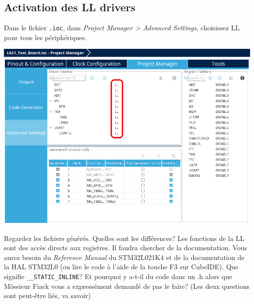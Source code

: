 \documentclass[12pt,%
addpoints,%
]{exam}
\begin{document}
\subsection{Activation des LL drivers}
\begin{questions}
	\question Dans le fichier \texttt{.ioc}, dans \emph{Project Manager > Advanced Settings}, choisissez LL pour tous les périphériques.
	\begin{center}
		\includegraphics[width=.9\linewidth]{figures/cube02.png} 
	\end{center}
	\question Regardez les fichiers générés. Quelles sont les différences?
	\question Les fonctions de la LL sont des accès directs aux registres. 
	Il faudra chercher de la documentation. Vous aurez besoin du \emph{Reference Manual} du STM32L021K4 et de la documentation de la HAL STM32L0 (ou lire le code à l'aide de la touche F3 sur CubeIDE).
	\question Que signifie \texttt{__STATIC_INLINE}? 
	\question Et pourquoi y a-t-il du code dans un .h alors que Môssieur Fiack vous a expressément demandé de pas le faire? (Les deux questions sont peut-être liés, va savoir)
\end{questions}

\newpage
\end{document}
